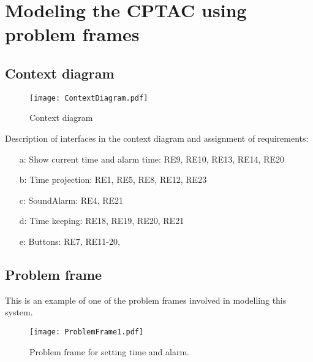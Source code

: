 \documentclass[Main_Assignment2]{subfiles}
\begin{document}
	\section{Modeling the CPTAC using problem frames}
	
		\subsection{Context diagram} %
		\label{sub:context_diagram}



		\begin{figure}[H]
		\centering
		\texttt{[image: ContextDiagram.pdf]}
		\caption{Context diagram}
		\label{fig:contextDiagram}
		\end{figure}

		Description of interfaces in the context diagram and assignment of requirements:
		
		\begin{enumerate}
			\item[a:] Show current time and alarm time: RE9, RE10, RE13, RE14, RE20
			\item[b:] Time projection: RE1, RE5, RE8, RE12, RE23
			\item[c:] SoundAlarm: RE4, RE21
			\item[d:] Time keeping: RE18, RE19, RE20, RE21
			\item[e:] Buttons: RE7, RE11-20, 
		\end{enumerate}
			

		\subsection{Problem frame} %
		\label{sub:problem_frame}
		
		This is an example of one of the problem frames involved in modelling this system.

		\begin{figure}[H]
		\centering
		\texttt{[image: ProblemFrame1.pdf]}
		\caption{Problem frame for setting time and alarm.}
		\label{fig:problemFrame}
		\end{figure}

\end{document}

